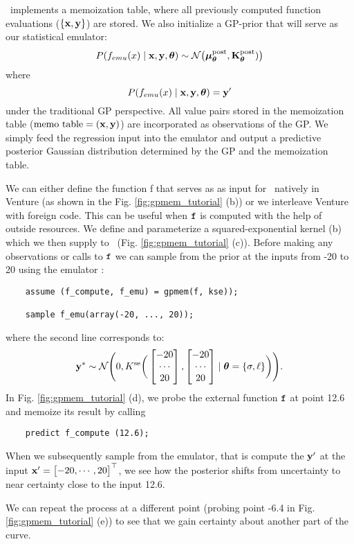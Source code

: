 \gpmem\ implements a memoization table, where all previously
computed function evaluations ($\{\mathbf{x},\mathbf{y}\}$) are stored. We also initialize a \ac{GP}-prior that
will serve as our statistical emulator:
\[
P(f_{emu}(x) \mid \mathbf{x},\mathbf{y},\bm{\theta})\sim
\mathcal{N}\big(\bm{\mu}_{\bm{\theta}}^\text{post},\mathbf{K}_{\bm{\theta}}^\text{post})\big)
\]
where 
\[
P(f_{emu}(x) \mid \mathbf{x},\mathbf{y},\bm{\theta}) = \mathbf{y}^\prime 
\]
under the traditional \ac{GP} perspective.
All value pairs stored in the memoization table ($\text{memo table} = (\mathbf{x},\mathbf{y})$) are incorporated as observations of
the \ac{GP}.
We simply feed the regression input
into the emulator and output a predictive posterior Gaussian distribution determined by the \ac{GP} and
the memoization table.

We can either define the function f that serves as as input for \gpmem\
 natively in Venture
(as shown in the Fig. \ref{fig:gpmem_tutorial} (b)) or we interleave Venture with foreign code. 
This can be useful when $\texttt{f}$ is computed with the help of outside resources.
We define and parameterize a squared-exponential kernel (b) which we then supply to
\gpmem\ (Fig. \ref{fig:gpmem_tutorial} (c)).
Before making any observations or calls to $\texttt{f}$
we can sample from the prior at the inputs from -20 to 20 using the emulator :
    \begin{lstlisting}
    assume (f_compute, f_emu) = gpmem(f, kse));

    sample f_emu(array(-20, ..., 20));
    \end{lstlisting}
where the second line corresponds to:
\[ 
\mathbf{y}^* \sim \mathcal{N}\Bigg(0,K^\text{se}\bigg(
\begin{bmatrix} 
-20 \\
\cdots \\
20
 \end{bmatrix},
\begin{bmatrix} 
-20 \\
\cdots \\
20
 \end{bmatrix}
\mid \bm{\theta}=\{\sigma,\ell\}
\bigg)
\Bigg).
\]
In Fig. \ref{fig:gpmem_tutorial} (d), we probe the external function $\texttt{f}$ at point 12.6 and memoize its result by calling 
   \begin{lstlisting}
    predict f_compute (12.6);
    \end{lstlisting}
When we subsequently sample from the emulator, that is compute the $\mathbf{y}^\prime$ at the input
$\mathbf{x}^\prime= \begin{bmatrix} -20, \cdots, 20 \end{bmatrix}^\top$, we see how the posterior shifts from uncertainty to near certainty close to the input 12.6.

We can repeat the process at a different point (probing point -6.4 in Fig.
\ref{fig:gpmem_tutorial} (e)) to see that we gain certainty about another part of the curve. 

